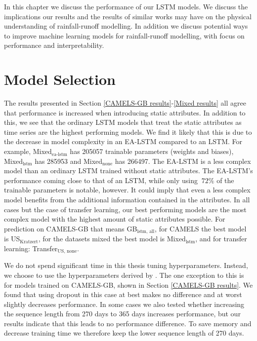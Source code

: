 In this chapter we discuss the performance of our LSTM models. We discuss the implications 
our results and the results of similar works may have on the physical understanding 
of rainfall-runoff modelling. In addition we discuss potential ways to improve machine 
learning models for rainfall-runoff modelling, with focus on performance and 
interpretability.
\section{Model Selection}
\label{discuss model selection}
The results presented in Section \ref{CAMELS-GB results}-\ref{Mixed results} 
all agree that performance is increased when introducing static attributes. 
In addition to this, we see that the ordinary LSTM models that treat the static 
attributes as time series are the highest performing models. We find it likely that 
this is due  to the decrease in model complexity in an EA-LSTM compared to an LSTM. 
For example, Mixed$_\text{ea-lstm}$ has 205057 trainable parameters (weights and 
biases), Mixed$_\text{lstm}$ has 285953 and Mixed$_\text{none}$ has 266497. The 
EA-LSTM is a less complex model than an ordinary LSTM trained without 
static attributes. The EA-LSTM's performance coming close to that of an 
LSTM, while only using $~72\%$ of the trainable parameters is notable, however. 
It could imply 
that even a less complex model benefits from the additional information 
contained in the attributes. 
In all cases but the case of transfer learning, our best performing models are the 
most complex model with the highest amount of static attributes possible. For 
prediction on CAMELS-GB that means GB$_\text{lstm, all}$, for CAMELS the best model 
is US$_\text{Kratzert}$, for the datasets mixed the best model is Mixed$_\text{lstm}$, 
and for transfer learning: Transfer$_\text{US, none}$.

We do not spend significant time in this thesis tuning hyperparameters. Instead, 
we choose to use the hyperparameters derived by \citet{lstm_second_paper}. The one 
exception to this is for models trained on CAMELS-GB, shown in Section 
\ref{CAMELS-GB results}. We found 
that using dropout in this case at best makes no difference and at worst slightly 
decreases performance. In some cases we also tested whether increasing the 
sequence length from 270 days to 365 days increases performance, but our results 
indicate that this leads to no performance difference. To save memory and decrease 
training time we therefore keep the lower sequence length of 270 days.

